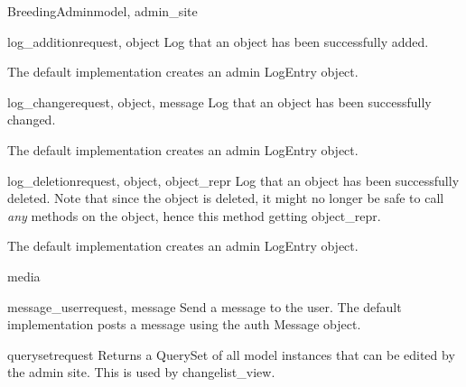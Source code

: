\documentclass[letterpaper,10pt,english]{sphinxmanual}
\begin{document}
\begin{classdesc}{BreedingAdmin}{model, admin\_site}
\hypertarget{animal.admin.BreedingAdmin.log_addition}{}\begin{methoddesc}{log\_addition}{request, object}
Log that an object has been successfully added.

The default implementation creates an admin LogEntry object.
\end{methoddesc}

\hypertarget{animal.admin.BreedingAdmin.log_change}{}\begin{methoddesc}{log\_change}{request, object, message}
Log that an object has been successfully changed.

The default implementation creates an admin LogEntry object.
\end{methoddesc}

\hypertarget{animal.admin.BreedingAdmin.log_deletion}{}\begin{methoddesc}{log\_deletion}{request, object, object\_repr}
Log that an object has been successfully deleted. Note that since the
object is deleted, it might no longer be safe to call \emph{any} methods
on the object, hence this method getting object\_repr.

The default implementation creates an admin LogEntry object.
\end{methoddesc}

\hypertarget{animal.admin.BreedingAdmin.media}{}\begin{memberdesc}{media}\end{memberdesc}

\hypertarget{animal.admin.BreedingAdmin.message_user}{}\begin{methoddesc}{message\_user}{request, message}
Send a message to the user. The default implementation
posts a message using the auth Message object.
\end{methoddesc}

\hypertarget{animal.admin.BreedingAdmin.queryset}{}\begin{methoddesc}{queryset}{request}
Returns a QuerySet of all model instances that can be edited by the
admin site. This is used by changelist\_view.
\end{methoddesc}


\end{classdesc}
\end{document}
